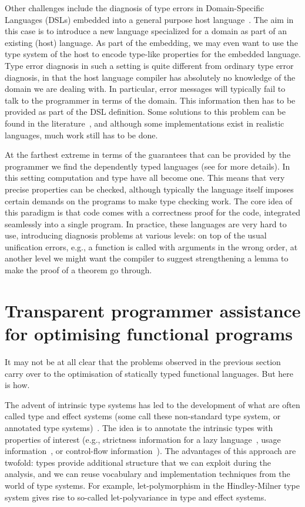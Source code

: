 \documentclass[sigplan,10pt,noacm]{acmart}
\begin{document}
Other challenges include the diagnosis of type errors in 
Domain-Specific Languages (DSLs) embedded into a general purpose host 
language~\cite{hudak96building}.
The aim in this case is to introduce a new language specialized for a domain
as part of an existing (host) language. As part of the embedding, we may
even want to use the type system of the host to encode type-like properties
for the embedded language. Type error diagnosis in such a setting is quite
different from ordinary type error diagnosis, in that the host language
compiler has absolutely no knowledge of the domain we are dealing with. In
particular, error messages will typically fail to talk to the
programmer in terms of the domain. This information then has to be provided as part of 
the DSL definition. Some solutions
to this problem can be found in the literature~\cite{serrano16twostage}, 
and although some
implementations exist in realistic languages, much work still has to be done.

At the farthest extreme in terms of the guarantees that can be provided
by the programmer we find the dependently typed languages (see \cite{wouter}
for more details). In this setting computation and type have all become one.
This means that very precise properties can be checked, although
typically the language itself imposes certain demands on the programs to 
make type checking work. The core idea of this paradigm is that code 
comes with a correctness proof for the code, integrated
seamlessly into a single program. In practice, these languages are very hard to
use, introducing diagnosis problems at various levels: on top of the 
usual unification errors, e.g., a function is called with arguments
in the wrong order, at another level we might want the compiler
to suggest strengthening a lemma to make the proof of a theorem go through. 

\section{Transparent programmer assistance for optimising functional programs}

It may not be at all clear that the problems observed in the previous
section carry over to the optimisation of statically typed functional
languages. But here is how.

The advent of intrinsic type systems has led to the development of what
are often called type and effect systems (some call these non-standard
type system, or annotated type systems)~\cite{lucassen88effectsystems}. The idea is to
annotate the intrinsic types
with properties of interest (e.g., strictness information for a lazy
language~\cite{holdermans11makingstricterness-jnl}, usage information~\cite{hage07generic}, 
or control-flow information~\cite{holdermans10higherranked}).
The advantages of this approach are twofold: types provide 
additional structure that we can exploit during the analysis, 
and we can reuse vocabulary and implementation techniques from the world of 
type systems. For example,
let-polymorphism in the Hindley-Milner type system gives rise
to so-called let-polyvariance in type and effect systems. 
\end{document}
